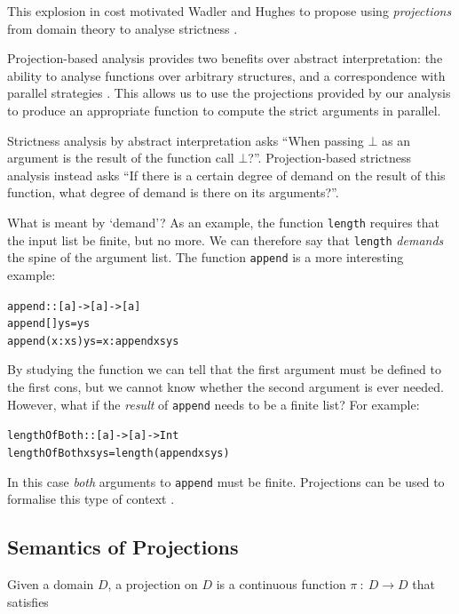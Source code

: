 This explosion in cost motivated Wadler and Hughes to propose using
\emph{projections} from domain theory to analyse strictness
\citep{wadler1987projections}.


Projection-based analysis provides two benefits over abstract interpretation:
the ability to analyse functions over arbitrary structures, and a
correspondence with parallel strategies \citep{marlow2010seq, strategies}. This
allows us to use the projections provided by our analysis to produce an
appropriate function to compute the strict arguments in parallel.

Strictness analysis by abstract interpretation asks ``When passing $\bot$ as an
argument is the result of the function call $\bot$?''. Projection-based
strictness analysis instead asks ``If there is a certain degree of demand on
the result of this function, what degree of demand is there on its
arguments?''.

What is meant by `demand'? As an example, the function \verb'length' requires
that the input list be finite, but no more. We can therefore say that
\verb'length' \emph{demands} the spine of the argument list. The function
\verb'append' is a more interesting example:

\begin{alltt}
        append :: [a] -> [a] -> [a]
        append []     ys = ys
        append (x:xs) ys = x : append xs ys
\end{alltt}

By studying the function we can tell that the first argument must be defined to
the first cons, but we cannot know whether the second argument is ever needed. However, what
if the \emph{result} of \verb'append' needs to be a finite list? For example:

\begin{alltt}

    lengthOfBoth :: [a] -> [a] -> Int
    lengthOfBoth xs ys = length (append xs ys)
\end{alltt}

In this case \emph{both} arguments to \verb'append' must be finite. Projections
can be used to formalise this type of context \citep{wadler1987projections,
hinze1995projection}.

\subsection*{Semantics of Projections}

Given a domain $D$, a projection on $D$ is a continuous function
$\pi \ : \ D \rightarrow D$ that satisfies

